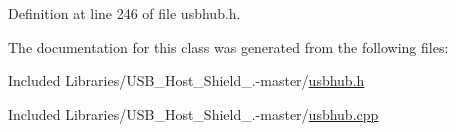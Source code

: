 \-Definition at line 246 of file usbhub.\-h.



\-The documentation for this class was generated from the following files\-:\begin{DoxyCompactItemize}
\item 
\-Included Libraries/\-U\-S\-B\-\_\-\-Host\-\_\-\-Shield\-\_.-\/master/\hyperlink{usbhub_8h}{usbhub.\-h}\item 
\-Included Libraries/\-U\-S\-B\-\_\-\-Host\-\_\-\-Shield\-\_.-\/master/\hyperlink{usbhub_8cpp}{usbhub.\-cpp}\end{DoxyCompactItemize}

